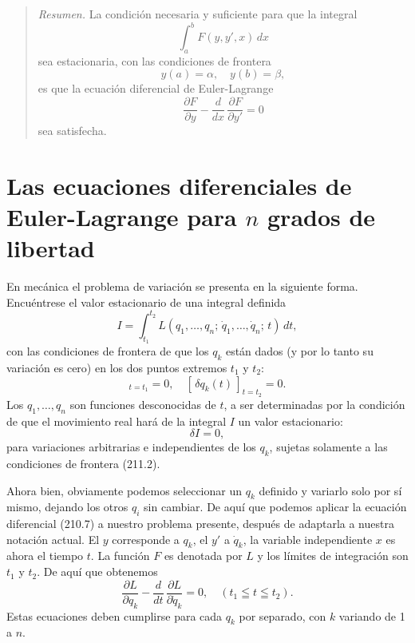 \documentclass[12pt,a4paper]{book}
\begin{document}
\begin{quote}
\textit{Resumen.} La condición necesaria y suficiente para que la integral
\[
\int_a^b F(y, y', x) \, dx
\]
sea estacionaria, con las condiciones de frontera
\[
y(a) = \alpha, \quad y(b) = \beta,
\]
es que la ecuación diferencial de Euler-Lagrange
\[
\frac{\partial F}{\partial y} - \frac{d}{dx} \, \frac{\partial F}{\partial y'} = 0
\]
sea satisfecha.
\end{quote}

\section{Las ecuaciones diferenciales de Euler-Lagrange para $n$ grados de libertad}

En mecánica el problema de variación se presenta en la siguiente forma. Encuéntrese el valor estacionario de una integral definida
\begin{equation}
I = \int_{t_1}^{t_2} L(q_1, \ldots, q_n;\, \dot{q}_1, \ldots, \dot{q}_n;\, t) \, dt, \tag{211.1}
\end{equation}
con las condiciones de frontera de que los $q_k$ están dados (y por lo tanto su variación es cero) en los dos puntos extremos $t_1$ y $t_2$:
\begin{equation}
[\,\delta q_k(t)\,]_{t = t_1} = 0, \quad [\,\delta q_k(t)\,]_{t = t_2} = 0. \tag{211.2}
\end{equation}
Los $q_1, \ldots, q_n$ son funciones desconocidas de $t$, a ser determinadas por la condición de que el movimiento real hará de la integral $I$ un valor estacionario:
\begin{equation}
\delta I = 0, \tag{211.3}
\end{equation}
para variaciones arbitrarias e independientes de los $q_k$, sujetas solamente a las condiciones de frontera (211.2).

Ahora bien, obviamente podemos seleccionar un $q_k$ definido y variarlo solo por sí mismo, dejando los otros $q_i$ sin cambiar. De aquí que podemos aplicar la ecuación diferencial (210.7) a nuestro problema presente, después de adaptarla a nuestra notación actual. El $y$ corresponde a $q_k$, el $y'$ a $\dot{q}_k$, la variable independiente $x$ es ahora el tiempo $t$. La función $F$ es denotada por $L$ y los límites de integración son $t_1$ y $t_2$. De aquí que obtenemos
\begin{equation}
\frac{\partial L}{\partial q_k} - \frac{d}{dt} \, \frac{\partial L}{\partial \dot{q}_k} = 0, \quad (t_1 \leqq t \leqq t_2). \tag{211.4}
\end{equation}
Estas ecuaciones deben cumplirse para cada $q_k$ por separado, con $k$ variando de 1 a $n$.
\end{document}
